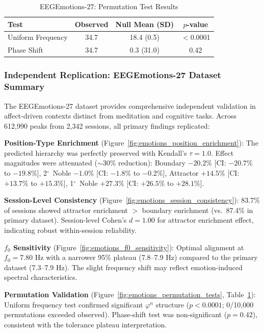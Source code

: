 \documentclass[11pt,a4paper]{article}
\newcommand{\degree}{$^\circ$}  %
\newcommand{\phisym}{\varphi}
\begin{document}
\begin{table}[H]
\centering
\caption{EEGEmotions-27: Permutation Test Results}
\label{tab:emotions_permutation}
\begin{tabular}{@{}lccc@{}}
\toprule
Test & Observed & Null Mean (SD) & $p$-value \\
\midrule
Uniform Frequency & 34.7 & 18.4 (0.5) & $<$0.0001 \\
Phase Shift & 34.7 & 0.3 (31.0) & 0.42 \\
\bottomrule
\end{tabular}
\end{table}

\subsubsection{Independent Replication: EEGEmotions-27 Dataset Summary}
The EEGEmotions-27 dataset \parencite{huy2025eeg} provides comprehensive independent validation in affect-driven contexts distinct from meditation and cognitive tasks. Across 612,990 peaks from 2,342 sessions, all primary findings replicated:

\textbf{Position-Type Enrichment} (Figure~\ref{fig:emotions_position_enrichment}): The predicted hierarchy was perfectly preserved with Kendall's $\tau = 1.0$. Effect magnitudes were attenuated ($\sim$30\% reduction): Boundary $-20.2\%$ [CI: $-20.7\%$ to $-19.8\%$], 2\degree\ Noble $-1.0\%$ [CI: $-1.8\%$ to $-0.2\%$], Attractor $+14.5\%$ [CI: $+13.7\%$ to $+15.3\%$], 1\degree\ Noble $+27.3\%$ [CI: $+26.5\%$ to $+28.1\%$].

\textbf{Session-Level Consistency} (Figure~\ref{fig:emotions_session_consistency}): 83.7\% of sessions showed attractor enrichment $>$ boundary enrichment (vs.\ 87.4\% in primary dataset). Session-level Cohen's $d = 1.00$ for attractor enrichment effect, indicating robust within-session reliability.

\textbf{$f_0$ Sensitivity} (Figure~\ref{fig:emotions_f0_sensitivity}): Optimal alignment at $f_0 = 7.80$ Hz with a narrower 95\% plateau (7.8--7.9 Hz) compared to the primary dataset (7.3--7.9 Hz). The slight frequency shift may reflect emotion-induced spectral characteristics.

\textbf{Permutation Validation} (Figure~\ref{fig:emotions_permutation_tests}, Table~\ref{tab:emotions_permutation}): Uniform frequency test confirmed significant $\phisym^n$ structure ($p < 0.0001$; 0/10,000 permutations exceeded observed). Phase-shift test was non-significant ($p = 0.42$), consistent with the tolerance plateau interpretation.
\end{document}
